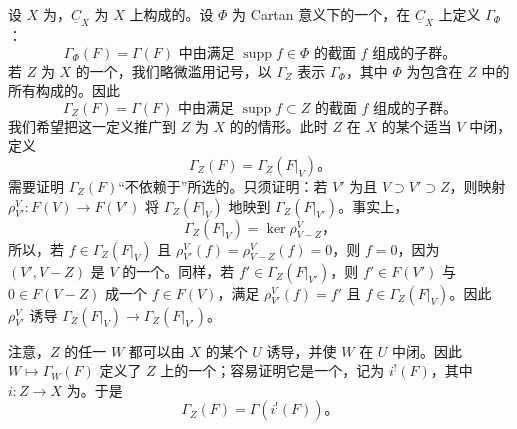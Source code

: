 设 $X$ 为，$\underline C_X$ 为 $X$ 上构成的。设 $\Phi$ 为 Cartan 意义下的一个，在 $\underline C_X$ 上定义 $\Gamma_\Phi$：
\[
\Gamma_\Phi(F)=\Gamma(F)\text{ 中由满足 }\operatorname{supp}f\in\Phi
\text{ 的截面 }f\text{ 组成的子群}。\tag{1}
\]
若 $Z$ 为 $X$ 的一个，我们略微滥用记号，以 $\Gamma_Z$ 表示 $\Gamma_\Phi$，其中 $\Phi$ 为包含在 $Z$ 中的所有构成的。因此
\[
\Gamma_Z(F)=\Gamma(F)\text{ 中由满足 }\operatorname{supp}f\subset Z
\text{ 的截面 }f\text{ 组成的子群}。\tag{2}
\]
我们希望把这一定义推广到 $Z$ 为 $X$ 的的情形。此时 $Z$ 在 $X$ 的某个适当 $V$ 中闭，定义
\[
\Gamma_Z(F)=\Gamma_Z(F|_V)。\tag{3}
\]
需要证明 $\Gamma_Z(F)$“不依赖于”所选的。只须证明：若 $V'$ 为且 $V\supset V'\supset Z$，则映射
$\rho^V_{V'}:F(V)\to F(V')$ 将 $\Gamma_Z(F|_V)$ 地映到 $\Gamma_Z(F|_{V'})$。事实上，
\[
\Gamma_Z(F|_V)=\ker\rho^V_{V-Z}，\tag{4}
\]
所以，若 $f\in\Gamma_Z(F|_V)$ 且 $\rho^V_{V'}(f)=\rho^V_{V-Z}(f)=0$，则 $f=0$，因为 $(V',V-Z)$ 是 $V$ 的一个。同样，若 $f'\in\Gamma_Z(F|_{V'})$，则 $f'\in F(V')$ 与 $0\in F(V-Z)$ 成一个 $f\in F(V)$，满足 $\rho^V_{V'}(f)=f'$ 且 $f\in\Gamma_Z(F|_V)$。因此 $\rho^V_{V'}$ 诱导
$\Gamma_Z(F|_V)\to\Gamma_Z(F|_{V'})$。

注意，$Z$ 的任一 $W$ 都可以由 $X$ 的某个 $U$ 诱导，并使 $W$ 在 $U$ 中闭。因此 $W\mapsto\Gamma_W(F)$ 定义了 $Z$ 上的一个；容易证明它是一个，记为 $i^!(F)$，其中 $i:Z\to X$ 为。于是
\[
\Gamma_Z(F)=\Gamma(i^!(F))。\tag{5}
\]

